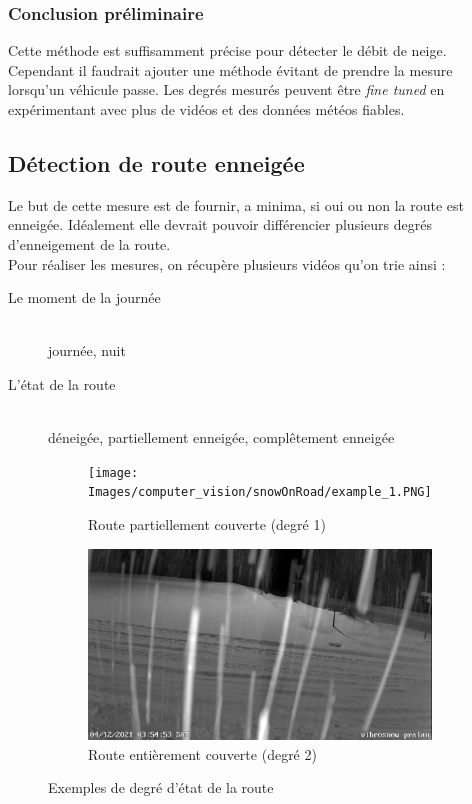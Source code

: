 \subsubsection{Conclusion préliminaire}
Cette méthode est suffisamment précise pour détecter le débit de neige. Cependant il faudrait
ajouter une méthode évitant de prendre la mesure lorsqu'un véhicule passe.
Les degrés mesurés peuvent être \emph{fine tuned} en expérimentant avec plus de vidéos et des données météos fiables.\newpage

\subsection{Détection de route enneigée}
Le but de cette mesure est de fournir, a minima, si oui ou non la route
est enneigée. Idéalement elle devrait pouvoir différencier plusieurs degrés
d'enneigement de la route. \\
Pour réaliser les mesures, on récupère plusieurs vidéos qu'on trie ainsi :
\begin{description}
    \item[Le moment de la journée] \hfill \\
    journée, nuit 
    \item[L'état de la route] \hfill \\
    déneigée, partiellement enneigée, complêtement enneigée 
\end{description}

\begin{figure}[H]
    \begin{subfigure}{.45\textwidth}
        \texttt{[image: Images/computer\_vision/snowOnRoad/example\_1.PNG]}
        \caption{Route partiellement couverte (degré 1)}
        \label{fig:SnowOnRoad_exemplePartial}
    \end{subfigure}
    \hfill
    \begin{subfigure}{.45\textwidth}
        \includegraphics[width=\linewidth]{Images/computer_vision/snowOnRoad/example_2.PNG}
        \caption{Route entièrement couverte (degré 2)}
        \label{fig:SnowOnRoad_exempleFully}
    \end{subfigure}
    \hfill
    \caption{Exemples de degré d'état de la route}
    \label{fig:SnowOnRoad_exemples}
\end{figure}

